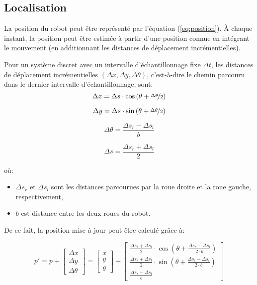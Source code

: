 \subsection{Localisation}

La position du robot peut être représenté par l'équation (\ref{eq:position}). À chaque instant, la position peut être estimée à partir d'une position connue en intégrant le mouvement (en additionnant les distances de déplacement incrémentielles).

Pour un système discret avec un intervalle d'échantillonnage fixe $\Delta t$, les distances de déplacement incrémentielles $\left ( \Delta x, \Delta y, \Delta \theta \right )$, c'est-à-dire le chemin parcouru dans le dernier intervalle d'échantillonnage, sont: 
\begin{equation}
    \Delta x = \Delta s \cdot \cos \left ( \theta + \nicefrac{\Delta \theta}{2} \right )
\end{equation}

\begin{equation}
    \Delta y = \Delta s \cdot \sin \left ( \theta + \nicefrac{\Delta \theta}{2} \right )
\end{equation}

\begin{equation}
    \Delta \theta = \frac{\Delta s_r - \Delta s_l}{b}
\end{equation}

\begin{equation}
    \Delta s = \frac{\Delta s_r + \Delta s_l}{2}
\end{equation}

où: 
\begin{itemize}
    \item $\Delta s_r$ et $\Delta s_l$ sont les distances parcourues par la roue droite et la roue gauche, respectivement,
    \item $b$ est distance entre les deux roues du robot.
\end{itemize}


De ce fait, la position mise à jour peut être calculé grâce à:

\begin{equation}
    p' = p + \left [
\begin{array}{l}
     \Delta x  \\
     \Delta y  \\
     \Delta \theta
\end{array}
    \right ] = \left [
\begin{array}{l}
     x  \\
     y  \\
     \theta
\end{array}
    \right ] + \left [
\begin{array}{c}
     \frac{\Delta s_r + \Delta s_l}{2} \cdot \cos \left ( \theta + \frac{\Delta s_r - \Delta s_l}{2\cdot b} \right )  \\
     \frac{\Delta s_r + \Delta s_l}{2} \cdot \sin \left ( \theta + \frac{\Delta s_r - \Delta s_l}{2\cdot b} \right )  \\
     \frac{\Delta s_r - \Delta s_l}{b}
\end{array}
    \right ]
\end{equation}